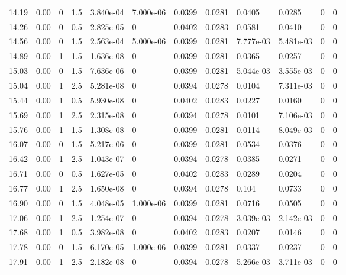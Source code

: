 \documentclass[preview]{standalone}
\begin{document}
{{{\begin{tabular}{L{1.2cm}C{1.2cm} C{0.3cm}C{0.5cm} C{1.4cm}C{1.4cm} C{1.4cm}C{1.4cm} C{1.6cm}C{1.6cm} C{1.6cm}C{1.6cm}}
  14.19  &  0.00  & 0     & 1.5 &  3.840e-04  & 7.000e-06  &  0.0399&   0.0281& 0.0405 & 0.0285   &  0 & 0  \\ 
  14.26  &  0.00  & 0     & 0.5 &  2.825e-05  & 0  &  0.0402&   0.0283& 0.0581 & 0.0410   &  0 & 0  \\ 
  14.56  &  0.00  & 0     & 1.5 &  2.563e-04  & 5.000e-06  &  0.0399&   0.0281& 7.777e-03 & 5.481e-03   &  0 & 0  \\ 
  14.89  &  0.00  & 1     & 1.5 &  1.636e-08  & 0  &  0.0399&   0.0281& 0.0365 & 0.0257   &  0 & 0  \\ 
  15.03  &  0.00  & 0     & 1.5 &  7.636e-06  & 0  &  0.0399&   0.0281& 5.044e-03 & 3.555e-03   &  0 & 0  \\ 
  15.04  &  0.00  & 1     & 2.5 &  5.281e-08  & 0  &  0.0394&   0.0278& 0.0104 & 7.311e-03   &  0 & 0  \\ 
  15.44  &  0.00  & 1     & 0.5 &  5.930e-08  & 0  &  0.0402&   0.0283& 0.0227 & 0.0160   &  0 & 0  \\ 
  15.69  &  0.00  & 1     & 2.5 &  2.315e-08  & 0  &  0.0394&   0.0278& 0.0101 & 7.106e-03   &  0 & 0  \\ 
  15.76  &  0.00  & 1     & 1.5 &  1.308e-08  & 0  &  0.0399&   0.0281& 0.0114 & 8.049e-03   &  0 & 0  \\ 
  16.07  &  0.00  & 0     & 1.5 &  5.217e-06  & 0  &  0.0399&   0.0281& 0.0534 & 0.0376   &  0 & 0  \\ 
  16.42  &  0.00  & 1     & 2.5 &  1.043e-07  & 0  &  0.0394&   0.0278& 0.0385 & 0.0271   &  0 & 0  \\ 
  16.71  &  0.00  & 0     & 0.5 &  1.627e-05  & 0  &  0.0402&   0.0283& 0.0289 & 0.0204   &  0 & 0  \\ 
  16.77  &  0.00  & 1     & 2.5 &  1.650e-08  & 0  &  0.0394&   0.0278& 0.104 & 0.0733   &  0 & 0  \\ 
  16.90  &  0.00  & 0     & 1.5 &  4.048e-05  & 1.000e-06  &  0.0399&   0.0281& 0.0716 & 0.0505   &  0 & 0  \\ 
  17.06  &  0.00  & 1     & 2.5 &  1.254e-07  & 0  &  0.0394&   0.0278& 3.039e-03 & 2.142e-03   &  0 & 0  \\ 
  17.68  &  0.00  & 1     & 0.5 &  3.982e-08  & 0  &  0.0402&   0.0283& 0.0207 & 0.0146   &  0 & 0  \\ 
  17.78  &  0.00  & 0     & 1.5 &  6.170e-05  & 1.000e-06  &  0.0399&   0.0281& 0.0337 & 0.0237   &  0 & 0  \\ 
  17.91  &  0.00  & 1     & 2.5 &  2.182e-08  & 0  &  0.0394&   0.0278& 5.266e-03 & 3.711e-03   &  0 & 0  \\ 

\end{tabular}}}}
\end{document}
